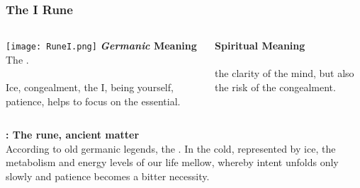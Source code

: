 \begin{frame}
\frametitle{The I Rune}
\begin{columns}[c] %

\texttt{[image: RuneI.png]}
\textbf{\textit{Germanic} Meaning}\\
The . \\
\\
Ice, congealment, the I, being yourself, patience, helps to focus on the essential.

\textbf{Spiritual Meaning}\\
\\

the clarity of the mind, but also the risk of the congealment.
\end{columns}

\vspace{5mm}
\textbf{: The  rune, ancient matter}\\
According to old germanic legends, the . In the cold, represented by ice, the metabolism and energy levels of our life mellow, whereby intent unfolds only slowly and patience becomes a bitter necessity.
\end{frame}



